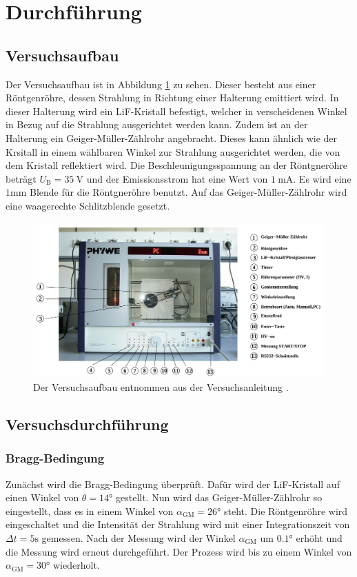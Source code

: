 \section{Durchführung}
\label{sec:Durchführung}

\subsection{Versuchsaufbau}
Der Versuchsaufbau ist in Abbildung \ref{fig:roehre} zu sehen.
Dieser besteht aus einer Röntgenröhre, dessen Strahlung in Richtung einer Halterung emittiert wird.
In dieser Halterung wird ein LiF-Kristall befestigt, welcher in verscheidenen Winkel in Bezug auf die Strahlung ausgerichtet werden kann.
Zudem ist an der Halterung ein Geiger-Müller-Zählrohr angebracht.
Dieses kann ähnlich wie der Krsitall in einem wählbaren Winkel zur Strahlung ausgerichtet werden, die von dem Kristall reflektiert wird.
Die Beschleunigungsspannung an der Röntgneröhre beträgt $U_\text{B} = \SI{35}{\volt}$ und der Emissionsstrom hat eine  Wert von $\SI{1}{\milli\ampere}$.
Es wird eine $1\si{\milli\meter}$ Blende für die Röntgneröhre benutzt.
Auf das Geiger-Müller-Zählrohr wird eine waagerechte Schlitzblende gesetzt.
\begin{figure}
    \centering
    \includegraphics[width=\textwidth]{content/data/Roehre.png}
    \caption{Der Versuchsaufbau entnommen aus der Versuchsanleitung \cite{anleitung}.}
    \label{fig:roehre}
\end{figure}


\subsection{Versuchsdurchführung}
\subsubsection{Bragg-Bedingung}
Zunächst wird die Bragg-Bedingung überprüft.
Dafür wird der LiF-Kristall auf einen Winkel von $\theta = 14\si{\degree}$ gestellt.
Nun wird das Geiger-Müller-Zählrohr so eingestellt, dass es in einem Winkel von $\alpha_\text{GM} = 26 \si{\degree}$ steht.
Die Röntgenröhre wird eingeschaltet und die Intensität der Strahlung wird mit einer Integrationszeit von $\Delta t = 5 \si{\second}$ gemessen.
Nach der Messung wird der Winkel $\alpha_\text{GM}$ um $0.1\si{\degree}$ erhöht und die Messung wird erneut durchgeführt.
Der Prozess wird bis zu einem Winkel von $\alpha_\text{GM} = 30\si{\degree}$ wiederholt.

